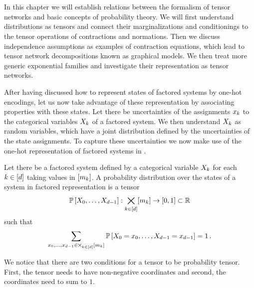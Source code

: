 \chapter{\chatextprobRepresentation}\label{cha:probRepresentation}

In this chapter we will establish relations between the formalism of tensor networks and basic concepts of probability theory.
We will first understand distributions as tensors and connect their marginalizations and conditionings to the tensor operations of contractions and normations.
Then we discuss independence assumptions as examples of contraction equations, which lead to tensor network decompositions known as graphical models.
We then treat more generic exponential families and investigate their representation as tensor networks.


After having discussed how to represent states of factored systems by one-hot encodings, let us now take advantage of these representation by associating properties with these states.
Let there be uncertainties of the assignments $x_{k}$ to the categorical variables $X_{k}$ of a factored system.
We then understand $X_{k}$ as random variables, which have a joint distribution defined by the uncertainties of the state assignments.
To capture these uncertainties we now make use of the one-hot representation of factored systems in .

\begin{definition}\label{def:probabilityDistribution} %
	Let there be a factored system defined by a categorical variable $X_{k}$ for each $k\in[d]$ taking values in $[m_{k}]$. 
	A probability distribution over the states of a system in factored representation is a tensor
		\[ \mathbb{P}\left[X_{0},\ldots,X_{d-1}\right] : \bigtimes_{k\in[d]}[m_{k}] \rightarrow [0, 1] \subset \mathbb{R} \]
	such that
		\[ \sum_{x_{0},\ldots,x_{d-1}\in\bigtimes_{k\in[d]}[m_{k}]} \mathbb{P}\left[X_{0}=x_{0},\ldots,X_{d-1}=x_{d-1}\right] = 1 \, . \]
\end{definition}

We notice that there are two conditions for a tensor to be probability tensor.
First, the tensor needs to have non-negative coordinates and second, the coordinates need to sum to $1$.

